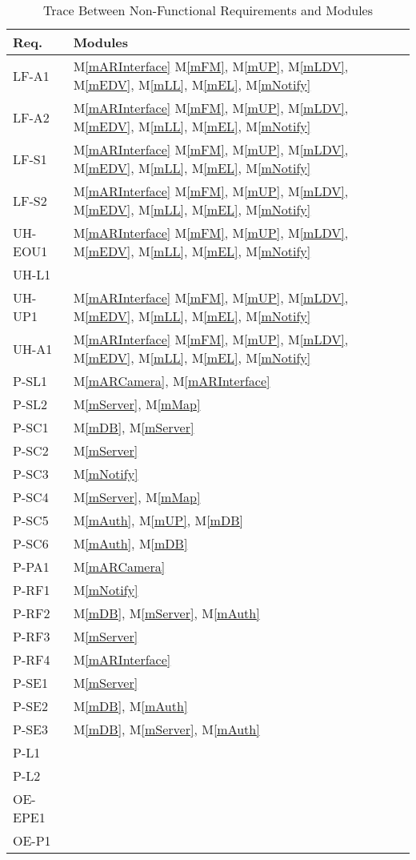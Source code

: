 \documentclass[12pt, titlepage]{article}
\newcommand{\mref}[1]{M\ref{#1}}
\begin{document}
\begin{table}[H]
\centering
\begin{tabular}{p{} p{}}
\toprule
\textbf{Req.} & \textbf{Modules}\\
\midrule
LF-A1 & \mref{mARInterface} \mref{mFM}, \mref{mUP}, \mref{mLDV}, \mref{mEDV}, \mref{mLL}, \mref{mEL}, \mref{mNotify}\\
LF-A2 & \mref{mARInterface} \mref{mFM}, \mref{mUP}, \mref{mLDV}, \mref{mEDV}, \mref{mLL}, \mref{mEL}, \mref{mNotify}\\
LF-S1 & \mref{mARInterface} \mref{mFM}, \mref{mUP}, \mref{mLDV}, \mref{mEDV}, \mref{mLL}, \mref{mEL}, \mref{mNotify}\\
LF-S2 & \mref{mARInterface} \mref{mFM}, \mref{mUP}, \mref{mLDV}, \mref{mEDV}, \mref{mLL}, \mref{mEL}, \mref{mNotify}\\
UH-EOU1 & \mref{mARInterface} \mref{mFM}, \mref{mUP}, \mref{mLDV}, \mref{mEDV}, \mref{mLL}, \mref{mEL}, \mref{mNotify}\\
UH-L1 & \\
UH-UP1 & \mref{mARInterface} \mref{mFM}, \mref{mUP}, \mref{mLDV}, \mref{mEDV}, \mref{mLL}, \mref{mEL}, \mref{mNotify}\\
UH-A1 & \mref{mARInterface} \mref{mFM}, \mref{mUP}, \mref{mLDV}, \mref{mEDV}, \mref{mLL}, \mref{mEL}, \mref{mNotify}\\
P-SL1 & \mref{mARCamera}, \mref{mARInterface}\\
P-SL2 & \mref{mServer}, \mref{mMap}\\
P-SC1 & \mref{mDB}, \mref{mServer}\\
P-SC2 & \mref{mServer}\\
P-SC3 & \mref{mNotify}\\
P-SC4 & \mref{mServer}, \mref{mMap}\\
P-SC5 & \mref{mAuth}, \mref{mUP}, \mref{mDB}\\
P-SC6 & \mref{mAuth}, \mref{mDB}\\
P-PA1 & \mref{mARCamera}\\
P-RF1 & \mref{mNotify}\\
P-RF2 & \mref{mDB}, \mref{mServer}, \mref{mAuth}\\
P-RF3 & \mref{mServer}\\
P-RF4 & \mref{mARInterface}\\
P-SE1 & \mref{mServer}\\
P-SE2 & \mref{mDB}, \mref{mAuth}\\
P-SE3 & \mref{mDB}, \mref{mServer}, \mref{mAuth}\\
P-L1 & \\
P-L2 & \\
OE-EPE1 & \\
OE-P1 & \\
\bottomrule
\end{tabular}
\caption{Trace Between Non-Functional Requirements and Modules}
\label{TblNFRT}
\end{table}
\end{document}
